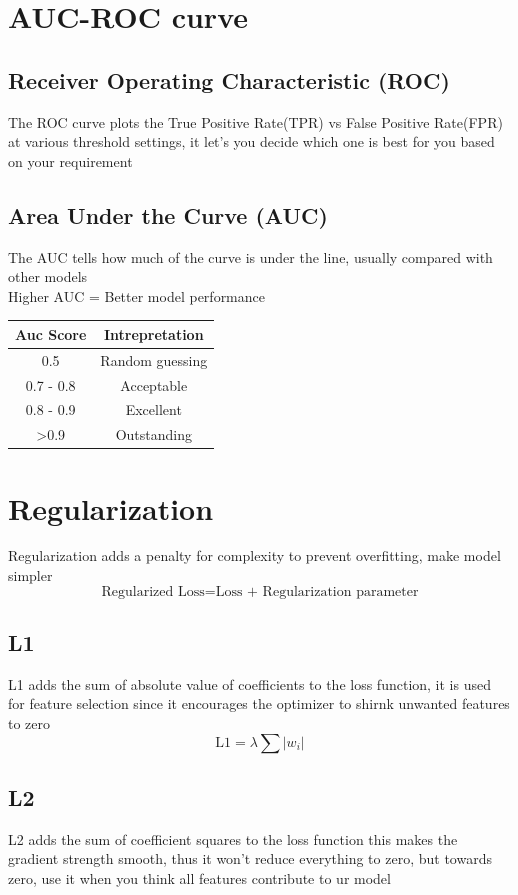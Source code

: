 \documentclass[12pt]{extarticle}
\begin{document}
\section{AUC-ROC curve}
\subsection{Receiver Operating Characteristic (ROC)}
The ROC curve plots the True Positive Rate(TPR) vs False Positive Rate(FPR) at various threshold settings,
it let's you decide which one is best for you based on your requirement
\subsection{Area Under the Curve (AUC)}
The AUC tells how much of the curve is under the line,
usually compared with other models\\
Higher AUC = Better model performance \\

\begin{table}[H]
    \centering
    \begin{tabular}{|c|c|}
        \hline
        Auc Score & Intrepretation \\
        \hline
         0.5 &  Random guessing \\
         0.7 - 0.8 & Acceptable \\
         0.8 - 0.9 & Excellent \\
         \textgreater 0.9 & Outstanding\\
         \hline     
    \end{tabular}
\end{table}

\section{Regularization}
Regularization adds a penalty for complexity to prevent overfitting, make model simpler
$$\text{Regularized Loss} = \text{Loss + Regularization parameter}$$

\subsection{L1}
L1 adds the sum of absolute value of coefficients to the loss function, 
it is used for feature selection since it encourages the optimizer to shirnk
unwanted features to zero
$$\text{L1} = \lambda \sum|w_i| $$

\subsection{L2}
L2 adds the sum of coefficient squares to the loss function this 
makes the gradient strength smooth, thus it won't reduce everything 
to zero, but towards zero, use it when you think all features contribute
to ur model
\end{document}
